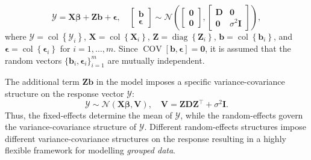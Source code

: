 \documentclass{article}\usepackage[]{graphicx}\usepackage[]{color}
\newcommand{\trans}{\ensuremath{^\top}}
\newcommand{\diag}{\operatorname{diag}}
\newcommand{\col}{\operatorname{col}}
\newcommand{\COV}{\operatorname{COV}}
\begin{document}
\begin{equation}
\label{eqn:lmm-stacked}
    \bm{\mathcal{Y}} = \bm{X}\bm{\beta} + \bm{Z}\bm{b} + \bm{\epsilon}, \quad
      \begin{bmatrix}
        \bm{b} \\
        \bm{\epsilon}
      \end{bmatrix} \sim
      \mathcal{N}\left(\begin{bmatrix}
        \bm{0} \\
        \bm{0}
      \end{bmatrix}, \begin{bmatrix}
        \bm{D} & \bm{0} \\
        \bm{0} & \sigma^2\bm{I}
      \end{bmatrix}\right),
\end{equation}
where $\bm{\mathcal{Y}} = \col\left\{\bm{\mathcal{Y}}_i\right\}$, $\bm{X} = \col\left\{\bm{X}_i\right\}$, $\bm{Z} = \diag\left\{\bm{Z}_i\right\}$, $\bm{b} = \col\left\{\bm{b}_i\right\}$, and $\bm{\epsilon} = \col\left\{\bm{\epsilon}_i\right\}$ for $i = 1, \dotsc, m$.  Since $\COV\left[\bm{b}, \bm{\epsilon}\right] = \bm{0}$, it is assumed that the random vectors $\big\{ \bm{b}_i, \bm{\epsilon}_i \big\}_{i=1}^m$ are mutually independent.

The additional term $\bm{Z}\bm{b}$ in the model imposes a specific variance-covariance structure on the response vector $\bm{\mathcal{Y}}$:
\[
  \bm{\mathcal{Y}} \sim \mathcal{N}\left(\bm{X}\bm{\beta}, \bm{V}\right), \quad \bm{V} = \bm{Z}\bm{D}\bm{Z}\trans + \sigma^2\bm{I}.
\]
Thus, the fixed-effects determine the mean of $\bm{\mathcal{Y}}$, while the random-effects govern the variance-covariance structure of $\bm{\mathcal{Y}}$.  Different random-effects structures impose different variance-covariance structures on the response resulting in a highly flexible framework for modelling \emph{grouped data}.
\end{document}
